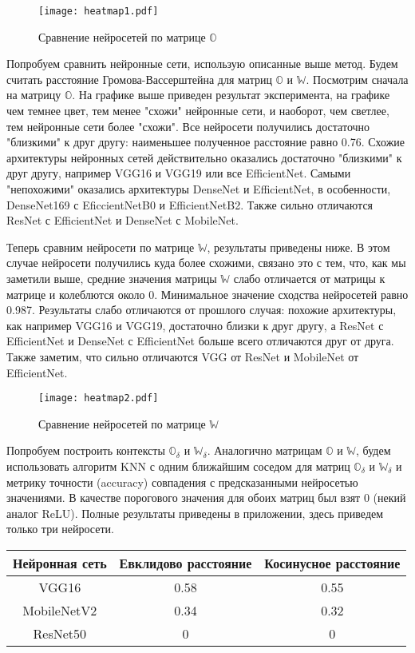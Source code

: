 \documentclass{article}
\begin{document}
\begin{figure}
    \texttt{[image: heatmap1.pdf]}
    \caption{Сравнение нейросетей по матрице $\mathbb{O}$}
\end{figure}

Попробуем сравнить нейронные сети, использую описанные выше метод. Будем считать расстояние Громова-Вассерштейна для матриц $\mathbb{O}$ и $\mathbb{W}$. Посмотрим сначала на матрицу $\mathbb{O}$. На графике выше приведен результат эксперимента, на графике чем темнее цвет, тем менее "схожи"\: нейронные сети, и наоборот, чем светлее, тем нейронные сети более "схожи". Все нейросети получились достаточно "близкими" \: к друг другу: наименьшее полученное расстояние равно 0.76. Схожие архитектуры нейронных сетей действительно оказались достаточно "близкими" \: к друг другу, например VGG16 и VGG19 или все EfficientNet. Самыми "непохожими" \: оказались архитектуры DenseNet и EfficientNet, в особенности, DenseNet169 с EficcientNetB0 и EfficientNetB2. Также сильно отличаются ResNet с EfficientNet и DenseNet с MobileNet. 

Теперь сравним нейросети по матрице $\mathbb{W}$, результаты приведены ниже. В этом случае нейросети получились куда более схожими, связано это с тем, что, как мы заметили выше, средние значения матрицы $\mathbb{W}$ слабо отличается от матрицы к матрице и колеблются около 0. Минимальное значение сходства нейросетей равно 0.987. Результаты слабо отличаются от прошлого случая: похожие архитектуры, как например VGG16 и VGG19, достаточно близки к друг другу, а ResNet с EfficientNet и DenseNet с EfficientNet больше всего отличаются друг от друга. Также заметим, что сильно отличаются VGG от ResNet и MobileNet от EfficientNet.

\begin{figure}
    \texttt{[image: heatmap2.pdf]}
    \caption{Сравнение нейросетей по матрице $\mathbb{W}$}
\end{figure}

Попробуем построить контексты $\mathbb{O}_\delta$ и $\mathbb{W}_\delta$. Аналогично матрицам $\mathbb{O}$ и $\mathbb{W}$, будем использовать алгоритм KNN с одним ближайшим соседом для матриц $\mathbb{O}_\delta$ и $\mathbb{W}_\delta$ и метрику точности (accuracy) совпадения с предсказанными нейросетью значениями. В качестве порогового значения для обоих матриц был взят 0 (некий аналог ReLU). Полные результаты приведены в приложении, здесь приведем только три нейросети.

\begin{center}
\begin{tabular}{ |c|c|c| } 
 \hline
 Нейронная сеть & Евклидово расстояние & Косинусное расстояние \\ 
 \hline
 \hline
 VGG16 & 0.58 & 0.55 \\
 \hline
 MobileNetV2 & 0.34 & 0.32 \\
 \hline
 ResNet50 & 0 & 0 \\
 \hline
\end{tabular}
\end{center}
\end{document}
